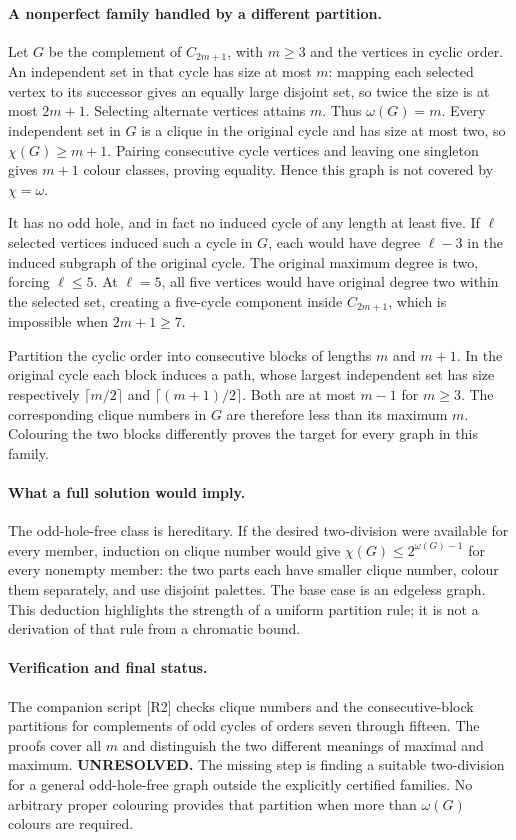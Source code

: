 \documentclass[11pt,a4paper]{article}
\begin{document}
\paragraph{A nonperfect family handled by a different partition.}
Let $G$ be the complement of $C_{2m+1}$, with $m\ge3$ and the
vertices in cyclic order. An independent set in that cycle has size
at most $m$: mapping each selected vertex to its successor gives
an equally large disjoint set, so twice the size is at most $2m+1$.
Selecting alternate vertices attains $m$. Thus $\omega(G)=m$.
Every independent set in $G$ is a clique in the original cycle and
has size at most two, so $\chi(G)\ge m+1$. Pairing consecutive
cycle vertices and leaving one singleton gives $m+1$ colour classes,
proving equality. Hence this graph is not covered by $\chi=\omega$.

It has no odd hole, and in fact no induced cycle of any length at
least five. If $\ell$ selected vertices induced such a cycle in
$G$, each would have degree $\ell-3$ in the induced subgraph of
the original cycle. The original maximum degree is two, forcing
$\ell\le5$. At $\ell=5$, all five vertices would have original
degree two within the selected set, creating a five-cycle component
inside $C_{2m+1}$, which is impossible when $2m+1\ge7$.

Partition the cyclic order into consecutive blocks of lengths $m$
and $m+1$. In the original cycle each block induces a path, whose
largest independent set has size respectively $\lceil m/2\rceil$
and $\lceil(m+1)/2\rceil$. Both are at most $m-1$ for $m\ge3$.
The corresponding clique numbers in $G$ are therefore less than its
maximum $m$. Colouring the two blocks differently proves the target
for every graph in this family.

\paragraph{What a full solution would imply.}
The odd-hole-free class is hereditary. If the desired two-division
were available for every member, induction on clique number would
give $\chi(G)\le2^{\omega(G)-1}$ for every nonempty member: the
two parts each have smaller clique number, colour them separately,
and use disjoint palettes. The base case is an edgeless graph.
This deduction highlights the strength of a uniform partition rule;
it is not a derivation of that rule from a chromatic bound.

\paragraph{Verification and final status.}
The companion script [R2] checks clique numbers and the consecutive-block
partitions for complements of odd cycles of orders seven through
fifteen. The proofs cover all $m$ and distinguish the two different
meanings of maximal and maximum. \textbf{UNRESOLVED.} The missing
step is finding a suitable two-division for a general odd-hole-free
graph outside the explicitly certified families. No arbitrary proper
colouring provides that partition when more than $\omega(G)$ colours
are required.
\end{document}
